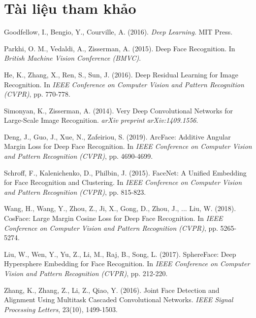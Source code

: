 \documentclass[12pt,a4paper]{report}
\begin{document}
\chapter*{Tài liệu tham khảo}

\begin{thebibliography}{50}

Goodfellow, I., Bengio, Y., Courville, A. (2016). \textit{Deep Learning}. MIT Press.

Parkhi, O. M., Vedaldi, A., Zisserman, A. (2015). Deep Face Recognition. In \textit{British Machine Vision Conference (BMVC)}.

He, K., Zhang, X., Ren, S., Sun, J. (2016). Deep Residual Learning for Image Recognition. In \textit{IEEE Conference on Computer Vision and Pattern Recognition (CVPR)}, pp. 770-778.

Simonyan, K., Zisserman, A. (2014). Very Deep Convolutional Networks for Large-Scale Image Recognition. \textit{arXiv preprint arXiv:1409.1556}.

Deng, J., Guo, J., Xue, N., Zafeiriou, S. (2019). ArcFace: Additive Angular Margin Loss for Deep Face Recognition. In \textit{IEEE Conference on Computer Vision and Pattern Recognition (CVPR)}, pp. 4690-4699.

Schroff, F., Kalenichenko, D., Philbin, J. (2015). FaceNet: A Unified Embedding for Face Recognition and Clustering. In \textit{IEEE Conference on Computer Vision and Pattern Recognition (CVPR)}, pp. 815-823.

Wang, H., Wang, Y., Zhou, Z., Ji, X., Gong, D., Zhou, J., ... Liu, W. (2018). CosFace: Large Margin Cosine Loss for Deep Face Recognition. In \textit{IEEE Conference on Computer Vision and Pattern Recognition (CVPR)}, pp. 5265-5274.

Liu, W., Wen, Y., Yu, Z., Li, M., Raj, B., Song, L. (2017). SphereFace: Deep Hypersphere Embedding for Face Recognition. In \textit{IEEE Conference on Computer Vision and Pattern Recognition (CVPR)}, pp. 212-220.

Zhang, K., Zhang, Z., Li, Z., Qiao, Y. (2016). Joint Face Detection and Alignment Using Multitask Cascaded Convolutional Networks. \textit{IEEE Signal Processing Letters}, 23(10), 1499-1503.


\end{thebibliography}
\end{document}
